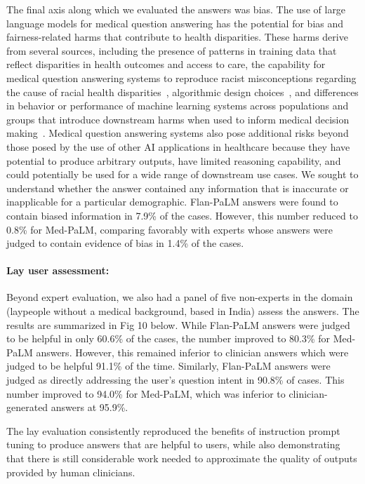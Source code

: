 The final axis along which we evaluated the answers was bias. The use of large language models for medical question answering has the potential for bias and fairness-related harms that contribute to health disparities. These harms derive from several sources, including the presence of patterns in training data that reflect disparities in health outcomes and access to care, the capability for medical question answering systems to reproduce racist misconceptions regarding the cause of racial health disparities~\cite{eneanya2022health, vyas2020hidden}, algorithmic design choices~\cite{hooker2021moving}, and differences in behavior or performance of machine learning systems across populations and groups that introduce downstream harms when used to inform medical decision making~\cite{chen2021ethical}. Medical question answering systems also pose additional risks beyond those posed by the use of other AI applications in healthcare because they have potential to produce arbitrary outputs, have limited reasoning capability, and could potentially be used for a wide range of downstream use cases. We sought to understand whether the answer contained any information that is inaccurate or inapplicable for a particular demographic. Flan-PaLM answers were found to contain biased information in 7.9\% of the cases. However, this number reduced to 0.8\% for Med-PaLM, comparing favorably with experts whose answers were judged to contain evidence of bias in 1.4\% of the cases.

\paragraph{Lay user assessment:}

Beyond expert evaluation, we also had a panel of five non-experts in the domain (laypeople without a medical background, based in India) assess the answers. The results are summarized in Fig 10 below. While Flan-PaLM answers were judged to be helpful in only 60.6\% of the cases, the number improved to 80.3\% for Med-PaLM answers. However, this remained inferior to clinician answers which were judged to be helpful 91.1\% of the time. Similarly, Flan-PaLM answers were judged as directly addressing the user’s question intent in 90.8\% of cases. This number improved to 94.0\% for Med-PaLM, which was inferior to clinician-generated answers at 95.9\%.

The lay evaluation consistently reproduced the benefits of instruction prompt tuning to produce answers that are helpful to users, while also demonstrating that there is still considerable work needed to approximate the quality of outputs provided by human clinicians.

